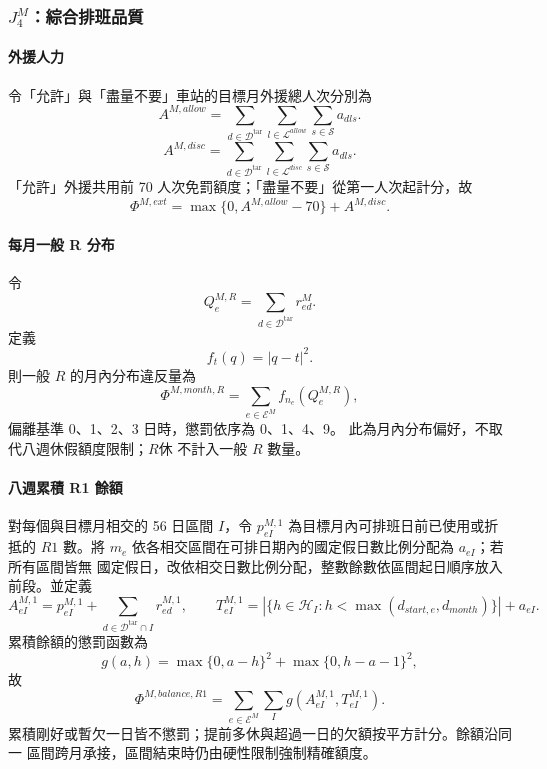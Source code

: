 \documentclass[a4paper,12pt]{article}
\begin{document}
\subsubsection{\texorpdfstring{$J^M_4$}{J4}：綜合排班品質}

\paragraph{外援人力}
令「允許」與「盡量不要」車站的目標月外援總人次分別為
\[
  A^{M,allow}
  =
  \sum_{d\in\mathcal{D}^{\mathrm{tar}}}
  \sum_{l\in\mathcal L^{allow}}
  \sum_{s\in\mathcal{S}}a_{dls}.
\]
\[
  A^{M,disc}
  =
  \sum_{d\in\mathcal{D}^{\mathrm{tar}}}
  \sum_{l\in\mathcal L^{disc}}
  \sum_{s\in\mathcal{S}}a_{dls}.
\]
「允許」外援共用前 70 人次免罰額度；「盡量不要」從第一人次起計分，故
\[
  \Phi^{M,ext}=\max\{0,A^{M,allow}-70\}+A^{M,disc}.
\]

\paragraph{每月一般 R 分布}
令
\[
  Q^{M,R}_e=\sum_{d\in\mathcal{D}^{\mathrm{tar}}}r^{M}_{ed}.
\]
定義
\[
  f_t(q)=|q-t|^2.
\]
則一般 \(R\) 的月內分布違反量為
\[
  \Phi^{M,month,R}
  =
  \sum_{e\in\mathcal{E}^{M}}f_{n_e}\!\left(Q^{M,R}_e\right),
\]
偏離基準 0、1、2、3 日時，懲罰依序為 0、1、4、9。
此為月內分布偏好，不取代八週休假額度限制；\(R休\) 不計入一般 \(R\) 數量。

\paragraph{八週累積 R1 餘額}
對每個與目標月相交的 56 日區間 \(I\)，令
\(p^{M,1}_{eI}\) 為目標月內可排班日前已使用或折抵的 \(R1\) 數。將 \(m_e\)
依各相交區間在可排日期內的國定假日數比例分配為 \(a_{eI}\)；若所有區間皆無
國定假日，改依相交日數比例分配，整數餘數依區間起日順序放入前段。並定義
\[
  A^{M,1}_{eI}=p^{M,1}_{eI}
  +\sum_{d\in\mathcal D^{\mathrm{tar}}\cap I}r^{M,1}_{ed},
  \qquad
  T^{M,1}_{eI}=|\{h\in\mathcal H_I:h<\max(d_{start,e},d_{month})\}|+a_{eI}.
\]
累積餘額的懲罰函數為
\[
  g(a,h)=\max\{0,a-h\}^2+\max\{0,h-a-1\}^2,
\]
故
\[
  \Phi^{M,balance,R1}=\sum_{e\in\mathcal E^M}\sum_{I}g(A^{M,1}_{eI},T^{M,1}_{eI}).
\]
累積剛好或暫欠一日皆不懲罰；提前多休與超過一日的欠額按平方計分。餘額沿同一
區間跨月承接，區間結束時仍由硬性限制強制精確額度。
\end{document}
